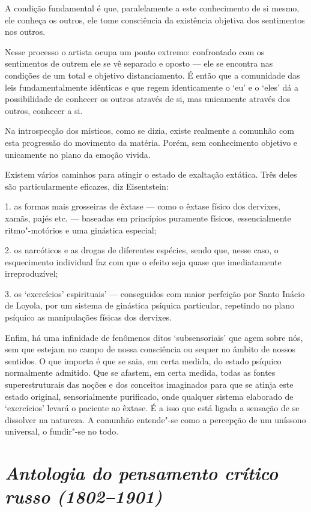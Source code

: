 A condição fundamental é que, paralelamente a este conhecimento de si
mesmo, ele conheça os outros, ele tome consciência da existência
objetiva dos sentimentos nos outros.

Nesse processo o artista ocupa um ponto extremo: confrontado com os
sentimentos de outrem ele se vê separado e oposto --- ele se encontra nas
condições de um total e objetivo distanciamento. É então que a
comunidade das leis fundamentalmente idênticas e que regem identicamente
o `eu' e o `eles' dá a possibilidade de conhecer os outros através de
si, mas unicamente através dos outros, conhecer a si.

Na introspecção dos místicos, como se dizia, existe realmente a comunhão
com esta progressão do movimento da matéria. Porém, sem conhecimento
objetivo e unicamente no plano da emoção vivida.

Existem vários caminhos para atingir o estado de exaltação extática.
Três deles são particularmente eficazes, diz Eisentstein:

1. as formas mais grosseiras de êxtase --- como o êxtase físico dos
dervixes, xamãs, pajés etc. --- baseadas em princípios puramente físicos,
essencialmente ritmo"-motórios e uma ginástica especial;

2. os narcóticos e as drogas de diferentes espécies, sendo que, nesse
caso, o esquecimento individual faz com que o efeito seja quase que
imediatamente irreproduzível;

3. os `exercícios' espirituais' --- conseguidos com maior perfeição por
Santo Inácio de Loyola, por um sistema de ginástica psíquica particular,
repetindo no plano psíquico as manipulações físicas dos dervixes.

Enfim, há uma infinidade de fenômenos ditos `subsensoriais' que agem
sobre nós, sem que estejam no campo de nossa consciência ou sequer no
âmbito de nossos sentidos. O que importa é que se saia, em certa medida,
do estado psíquico normalmente admitido. Que se afastem, em certa
medida, todas as fontes superestruturais das noções e dos conceitos
imaginados para que se atinja este estado original, sensorialmente
purificado, onde qualquer sistema elaborado de `exercícios' levará o
paciente ao êxtase. É a isso que está ligada a sensação de se dissolver
na natureza. A comunhão entende"-se como a percepção de um uníssono
universal, o fundir"-se no todo.

\chapter{\emph{Antologia do pensamento crítico russo (1802--1901)}}

